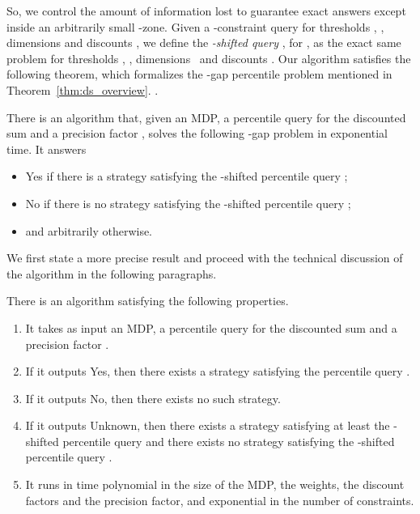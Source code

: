 \documentclass{llncs}
\begin{document}
So, we control the amount of information lost to guarantee exact answers except inside an arbitrarily small -zone.
Given a -constraint query  for thresholds , ,
dimensions  and discounts , we define the
\textit{-shifted query} , for , as the exact same
problem for thresholds , , dimensions~ and discounts
. Our algorithm satisfies the following theorem, which formalizes
the -gap percentile problem mentioned in
Theorem~\ref{thm:ds_overview}. .
\begin{theorem}
\label{thm:ds_gap}
There is an algorithm that, given an MDP, a percentile query  for the discounted sum and a precision factor , solves the following -gap problem in exponential time. It answers
\begin{itemize}
\item \textsf{Yes} if there is a strategy satisfying the -shifted percentile query ;

\item \textsf{No} if there is no strategy satisfying the -shifted percentile query ;

\item and arbitrarily otherwise.
\end{itemize}
\end{theorem}


We first state a more precise result and proceed with the technical discussion of the algorithm in the following paragraphs.

\begin{theorem}
\label{thm:disc_algo}
There is an algorithm satisfying the following properties.
\begin{enumerate}
\item It takes as input an MDP, a percentile query  for the discounted sum and a precision factor .
\item If it outputs \textsf{Yes}, then there exists a strategy satisfying the percentile query .
\item If it outputs \textsf{No}, then there exists no such strategy.
\item If it outputs \textsf{Unknown}, then there exists a strategy satisfying at least the -shifted percentile query  and there exists no strategy satisfying the -shifted percentile query .
\item It runs in time polynomial in the size of the MDP, the weights, the discount factors and the precision factor, and exponential in the number of constraints.
\end{enumerate}
\end{theorem}
\end{document}
